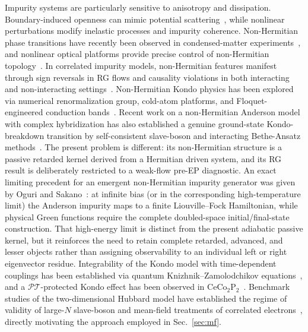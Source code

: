 \documentclass[%
  aps,prb,reprint,amsmath,amssymb,superscriptaddress,longbibliography,floatfix
]{revtex4-2}
\newcommand{\PT}{\mathcal{PT}}
\begin{document}
Impurity systems are particularly sensitive to anisotropy and
dissipation.
Boundary-induced openness can mimic potential
scattering~\cite{kattel2024kondo,kattel2024spin,kattel2024dissipation},
while nonlinear perturbations modify inelastic processes and impurity
coherence.
Non-Hermitian phase transitions have recently been observed in
condensed-matter
experiments~\cite{li2024discoverynonhermitianphasetransition},
and nonlinear optical platforms provide precise control of
non-Hermitian
topology~\cite{dai2024non,PhysRevLett.132.156901,khanikaev2024topological}.
In correlated impurity models, non-Hermitian features manifest
through sign reversals in RG flows and causality violations in both
interacting and non-interacting
settings~\cite{PhysRevB.111.125157,han2023complex,
PhysRevB.111.045124,kulkscipo}.
Non-Hermitian Kondo physics has been explored via numerical
renormalization group, cold-atom platforms, and Floquet-engineered
conduction bands~\cite{burke2025non,PhysRevB.108.155120,SBkeld}.
Recent work on a non-Hermitian Anderson model with complex hybridization has
also established a genuine ground-state Kondo-breakdown transition by
self-consistent slave-boson and interacting Bethe-Ansatz
methods~\cite{yamamoto2026complex}.  The present problem is different: its
non-Hermitian structure is a passive retarded kernel derived from a Hermitian
driven system, and its RG result is deliberately restricted to a weak-flow
pre-EP diagnostic.
An exact limiting precedent for an emergent non-Hermitian impurity generator
was given by Oguri and Sakano~\cite{oguri2013highbias}: at infinite bias (or
in the corresponding high-temperature limit) the Anderson impurity maps to a
finite Liouville--Fock Hamiltonian, while physical Green functions require the
complete doubled-space initial/final-state construction.  That high-energy
limit is distinct from the present adiabatic passive kernel, but it reinforces
the need to retain complete retarded, advanced, and lesser objects rather than
assigning observability to an individual left or right eigenvector residue.
Integrability of the Kondo model with time-dependent couplings
has been established via quantum Knizhnik--Zamolodchikov
equations~\cite{pasnoori2025tdkondo}, and a $\PT$-protected
Kondo effect has been observed in
CeCo$_2$P$_2$~\cite{hu2025ceco2p2}.
Benchmark studies of the two-dimensional Hubbard model have
established the regime of validity of large-$N$ slave-boson and
mean-field treatments of correlated
electrons~\cite{simons2015hubbard}, directly motivating the
approach employed in Sec.~\ref{sec:mf}.
\end{document}
